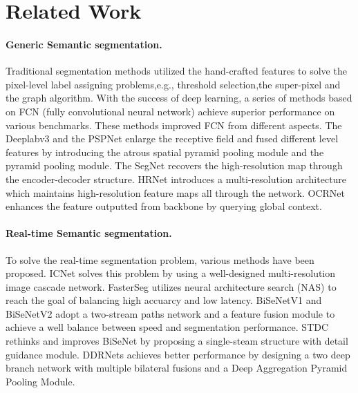 \documentclass{article}
\begin{document}
\section{Related Work}

\paragraph{Generic Semantic segmentation.}
Traditional segmentation methods utilized the hand-crafted features to solve the pixel-level label assigning problems,e.g., threshold selection\cite{4310076},the super-pixel\cite{6205760} and the graph algorithm\cite{937505}. With the success of deep learning, a series of methods\cite{deeplabV3,SegNet,zhao2017pyramid} based on FCN (fully convolutional neural network) \cite{DBLP:journals/corr/LongSD14} achieve superior performance on various benchmarks. These methods improved FCN from different aspects. The Deeplabv3 \cite{deeplabV3} and the PSPNet\cite{zhao2017pyramid} enlarge the receptive field and fused different level features by introducing the atrous spatial pyramid pooling module and the pyramid pooling module. The SegNet\cite{SegNet} recovers the high-resolution map through the encoder-decoder structure. HRNet \cite{wang2020deep} introduces a multi-resolution architecture which maintains high-resolution feature maps all through the network. OCRNet \cite{yuan2020object} enhances the feature outputted from backbone by querying global context.

\vspace{-2mm}
\paragraph{Real-time Semantic segmentation.}
To solve the real-time segmentation problem, various methods\cite{zhao2018icnet, yu2018bisenet, yu2021bisenet,hong2021deep,fan2021rethinking,chen2019fasterseg} have been proposed. ICNet\cite{zhao2018icnet} solves this problem by using a well-designed multi-resolution image cascade network. FasterSeg\cite{chen2019fasterseg} utilizes neural architecture search (NAS) to reach the goal of balancing high accuarcy and low latency.
BiSeNetV1\cite{yu2018bisenet} and BiSeNetV2 \cite{yu2021bisenet} adopt a two-stream paths network and a feature fusion module to achieve a well balance between speed and segmentation performance. STDC\cite{fan2021rethinking} rethinks and improves BiSeNet by proposing a single-steam structure with detail guidance module. DDRNets\cite{hong2021deep} achieves better performance by designing a two deep branch network with multiple bilateral fusions and a Deep Aggregation Pyramid Pooling Module.
\end{document}
